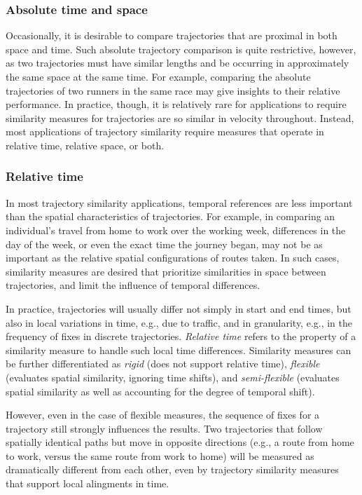 \documentclass{interact}
\begin{document}
\subsubsection{Absolute time and space}
Occasionally, it is desirable to compare trajectories that are proximal in both space and time.
Such absolute trajectory comparison is quite restrictive, however, as two trajectories must have  similar lengths and be occurring in approximately the same space at the same time. For example, comparing the absolute trajectories of two runners in the same race may give insights to their relative performance. In practice, though, it is relatively rare for applications to require similarity measures for trajectories are so similar in velocity throughout. Instead, most applications of trajectory similarity require measures that operate in relative time, relative space, or both.


\subsubsection{Relative time}	
In most trajectory similarity applications, temporal references are less important than the spatial characteristics of trajectories. For example, in comparing an individual's travel from home to work over the working week, differences in the day of the week, or even the exact time the journey began, may not be as important as the relative spatial configurations of routes taken. In such cases, similarity measures are desired that prioritize similarities in space between trajectories, and limit the influence of temporal differences. 

In practice, trajectories will usually differ not simply in start and end times, but also in local variations in time, e.g., due to traffic, and in granularity, e.g., in the frequency of fixes in discrete trajectories. \emph{Relative time} refers to the property of a similarity measure to handle such local time differences. Similarity measures can be further differentiated as \emph{rigid} (does not support relative time), \emph{flexible} (evaluates spatial similarity, ignoring time shifts), and \emph{semi-flexible} (evaluates spatial similarity as well as accounting for the degree of temporal shift).

However, even in the case of flexible measures, the sequence of fixes for a trajectory still strongly influences the results. Two trajectories that follow spatially identical paths but move in opposite directions (e.g., a route from home to work, versus the same route from work to home) will be measured as dramatically different from each other, even by trajectory similarity measures that support local alingments in time.
\end{document}
